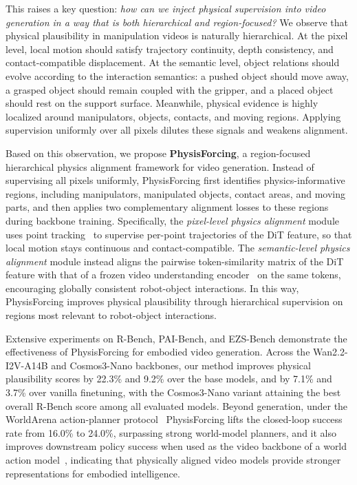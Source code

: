 This raises a key question: \textit{how can we inject physical supervision into video generation in a way that is both hierarchical and region-focused?} We observe that physical plausibility in manipulation videos is naturally hierarchical. At the pixel level, local motion should satisfy trajectory continuity, depth consistency, and contact-compatible displacement. At the semantic level, object relations should evolve according to the interaction semantics: a pushed object should move away, a grasped object should remain coupled with the gripper, and a placed object should rest on the support surface. Meanwhile, physical evidence is highly localized around manipulators, objects, contacts, and moving regions. Applying supervision uniformly over all pixels dilutes these signals and weakens alignment.

Based on this observation, we propose \textbf{PhysisForcing}, a region-focused hierarchical physics alignment framework for video generation. Instead of supervising all pixels uniformly, PhysisForcing first identifies physics-informative regions, including manipulators, manipulated objects, contact areas, and moving parts, and then applies two complementary alignment losses to these regions during backbone training. Specifically, the \textit{pixel-level physics alignment} module uses point tracking~\cite{karaev24cotracker3} to supervise per-point trajectories of the DiT feature, so that local motion stays continuous and contact-compatible. The \textit{semantic-level physics alignment} module instead aligns the pairwise token-similarity matrix of the DiT feature with that of a frozen video understanding encoder~\cite{bardes2024revisiting} on the same tokens, encouraging globally consistent robot-object interactions. In this way, PhysisForcing improves physical plausibility through hierarchical supervision on regions most relevant to robot-object interactions.

Extensive experiments on R-Bench, PAI-Bench, and EZS-Bench demonstrate the effectiveness of PhysisForcing for embodied video generation. Across the Wan2.2-I2V-A14B and Cosmos3-Nano backbones, our method improves physical plausibility scores by 22.3\% and 9.2\% over the base models, and by 7.1\% and 3.7\% over vanilla finetuning, with the Cosmos3-Nano variant attaining the best overall R-Bench score among all evaluated models. Beyond generation, under the WorldArena action-planner protocol~\cite{shang2026worldarena} PhysisForcing lifts the closed-loop success rate from 16.0\% to 24.0\%, surpassing strong world-model planners, and it also improves downstream policy success when used as the video backbone of a world action model~\cite{yuan2026fastwam}, indicating that physically aligned video models provide stronger representations for embodied intelligence.

